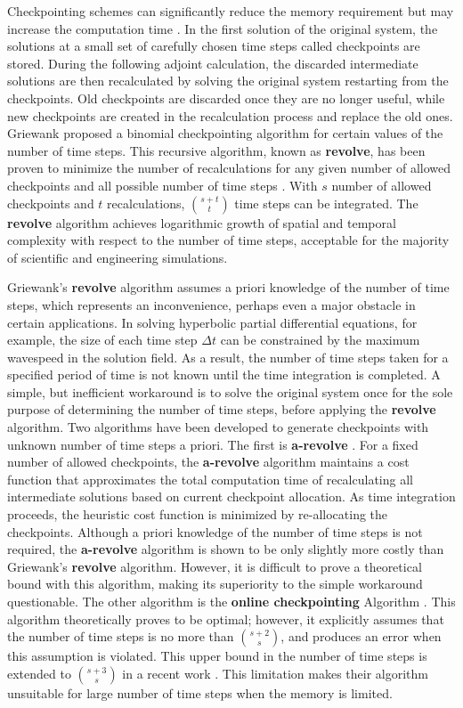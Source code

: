 \documentclass[oneeqnum, onethmnum, onefignum, onetabnum]{siamltex}
\begin{document}
Checkpointing schemes can significantly reduce the memory requirement but may
increase the computation time \cite{charpentier01} \cite{griewankbook}.
In the first solution of
the original system, the solutions at a small set of carefully chosen time steps
called checkpoints are stored.  During the following adjoint calculation, the
discarded intermediate solutions are then recalculated by solving the original
system restarting from the checkpoints.  Old checkpoints are discarded
once they are no longer useful, while new checkpoints are created in the
recalculation process and replace the old ones.  Griewank \cite{griewank92}
proposed a binomial checkpointing algorithm for certain values of the number
of time steps.  This recursive algorithm, known as {\bf revolve}, has been
proven to minimize the number of recalculations for any given
number of allowed checkpoints and all possible number of time
steps \cite{griewank00}.  With $s$ number of allowed checkpoints and $t$
recalculations, $\binom{s + t}{t}$ time steps can
be integrated.  The {\bf revolve} algorithm achieves logarithmic growth of
spatial and temporal complexity with respect to the number of time steps,
acceptable for the majority of scientific and engineering simulations.

Griewank's {\bf revolve} algorithm assumes a priori knowledge of the number of
time steps,  which represents an inconvenience, perhaps even a major obstacle
in certain applications.  In solving hyperbolic partial differential equations,
for example, the size of each time step $\Delta t$ can be constrained by the
maximum wavespeed in the solution field.  As a result, the number of time
steps taken for a specified
period of time is not known until the time integration is completed.  A simple,
but inefficient workaround is to solve the original system once for the sole
purpose of determining the number of time steps, before applying the
{\bf revolve} algorithm.  Two algorithms have been developed
to generate checkpoints with unknown number of time steps a priori.
The first is {\bf a-revolve} \cite{hinze2005}.
For a fixed number of allowed checkpoints, the {\bf a-revolve} algorithm
maintains a cost function that approximates the total computation time of
recalculating all intermediate solutions based on current checkpoint
allocation.  As time
integration proceeds, the heuristic cost function is minimized by re-allocating
the checkpoints.  Although a priori knowledge of the number of time steps is not
required, the {\bf a-revolve} algorithm is shown to be only slightly more
costly than Griewank's {\bf revolve} algorithm.  However, it is difficult to
prove a theoretical bound with this algorithm, making its superiority to the
simple workaround questionable.  The other algorithm is the
{\bf online checkpointing} Algorithm \cite{heuveline2006}.  This algorithm
theoretically proves to be optimal; however, it explicitly assumes that the
number of time steps is no more than $\binom{s + 2}{s}$, and
produces an error when this assumption is violated.  This upper bound in the
number of time steps is extended to $\binom{s + 3}{s}$
in a recent work \cite{andrea08}.
This limitation makes their algorithm unsuitable for large number of time
steps when the memory is limited.
\end{document}
